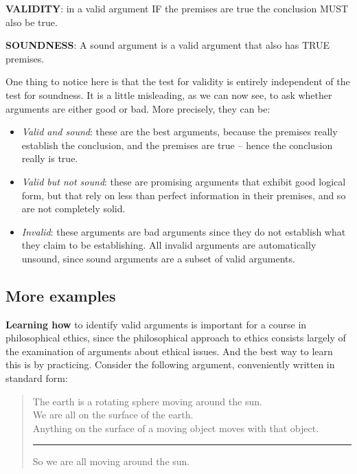\documentclass[]{book}
\makeatletter
\newenvironment{kframe}{%
\medskip{}
\setlength{\fboxsep}{.8em}
 \def\at@end@of@kframe{}%
 \ifinner\ifhmode%
  \def\at@end@of@kframe{\end{minipage}}%
  \begin{minipage}{\columnwidth}%
 \fi\fi%
 \def\FrameCommand##1{\hskip\@totalleftmargin \hskip-\fboxsep
 \colorbox{shadecolor}{##1}\hskip-\fboxsep
     \hskip-\linewidth \hskip-\@totalleftmargin \hskip\columnwidth}%
 \MakeFramed {\advance\hsize-\width
   \@totalleftmargin\z@ \linewidth\hsize
   \@setminipage}}%
 {\par\unskip\endMakeFramed%
 \at@end@of@kframe}
\newenvironment{rmdblock}[1]
  {
  \begin{itemize}
  \renewcommand{\labelitemi}{
    \raisebox{-.7\height}[0pt][0pt]{
      {\setkeys{Gin}{width=3em,keepaspectratio}\texttt{[image: img/\#1]}}
    }
  }
  \setlength{\fboxsep}{1em}
  \begin{kframe}
  \item
  }
  {
  \end{kframe}
  \end{itemize}
  }
\newenvironment{rmdimportant}
  {\begin{rmdblock}{important}}
  {\end{rmdblock}}
\newenvironment{argument}{\begin{quote}\normalsize}{\end{quote}}
\makeatother
\begin{document}
\begin{rmdimportant}
\textbf{VALIDITY}: in a valid argument IF the premises are true the
conclusion MUST also be true.

\textbf{SOUNDNESS}: A sound argument is a valid argument that also has
TRUE premises.
\end{rmdimportant}

One thing to notice here is that the test for validity is entirely independent of the test for soundness. It is a little misleading, as we can now see, to ask whether arguments are either good or bad. More precisely, they can be:

\begin{itemize}
\item
  \emph{Valid and sound}: these are the best arguments, because the premises really establish the conclusion, and the premises are true -- hence the conclusion really is true.
\item
  \emph{Valid but not sound}: these are promising arguments that exhibit good logical form, but that rely on less than perfect information in their premises, and so are not completely solid.
\item
  \emph{Invalid}: these arguments are bad arguments since they do not establish what they claim to be establishing. All invalid arguments are automatically unsound, since sound arguments are a subset of valid arguments.
\end{itemize}

\hypertarget{more-examples}{%
\subsection*{More examples}\label{more-examples}}


\textbf{Learning how} to identify valid arguments is important for a course in philosophical ethics, since the philosophical approach to ethics consists largely of the examination of arguments about ethical issues. And the best way to learn this is by practicing. Consider the following argument, conveniently written in standard form:

\begin{argument}
The earth is a rotating sphere moving around the sun.\\
We are all on the surface of the earth.\\
Anything on the surface of a moving object moves with that object.\\

\begin{center}\rule{0.5\linewidth}{\linethickness}\end{center}

So we are all moving around the sun.
\end{argument}
\end{document}
